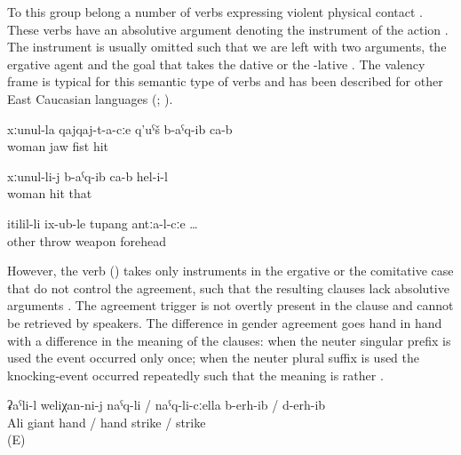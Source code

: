 To this group belong a number of verbs expressing violent physical contact . These verbs have an absolutive argument denoting the instrument of the action . The instrument is usually omitted such that we are left with two arguments, the ergative agent and the goal that takes the dative or the -lative . The valency frame is typical for this semantic type of verbs and has been described for other East Caucasian languages (\citealp[332]{Khalilova2009}; \citealp[476]{Forker2013a}). 
%
\begin{exe}
	\ex	\label{ex:transitive contact verbs}
	\begin{xlist}
		\ex	{} 
		\ex	{} 
		\ex	{} 
	\end{xlist}

	\ex	\label{ex:He hit with the fist on the jaw of his wife}
	\gll	xːunul-la	qajqaj-t-a-cːe	q'uˁš	b-aˁq-ib	ca-b\\
		woman	jaw	fist	hit	\\
	\glt	{}

	\ex	\label{ex:He hit his wife}
	\gll	xːunul-li-j	b-aˁq-ib	ca-b	hel-i-l\\
		woman	hit		that\\
	\glt	{}

	\ex	\label{ex:when the other shot into the forehead}
	\gll	itilil-li	ix-ub-le	tupang	antːa-l-cːe	\ldots\\
		other	throw	weapon	forehead\\
	\glt	{}
\end{exe}

However, the verb  ()  takes only instruments in the ergative or the comitative case that do not control the agreement, such that the resulting clauses lack absolutive arguments . The agreement trigger is not overtly present in the clause and cannot be retrieved by speakers. The difference in gender agreement goes hand in hand with a difference in the meaning of the clauses: when the neuter singular prefix  is used the event occurred only once; when the neuter plural suffix is used the knocking-event occurred repeatedly such that the meaning is rather .
%
\begin{exe}
	\ex	\label{ex:‎‎‎Ali knocked / beat off the giant with the hand}
	\gll	ʡaˁli-l	weliχan-ni-j	naˁq-li	/	naˁq-li-cːella b-erh-ib	/	d-erh-ib\\
		Ali	giant	hand / hand	strike	/	strike\\
	\glt	{} (E)
\end{exe}

